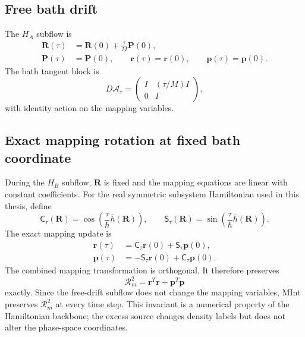 \documentclass[
  11pt,
  letterpaper,
  onehalfspacing,
  normalmargins,
  equalmargins,
  oneside
]{ut-thesis}
\begin{document}
\subsection{Free bath drift}
\label{subsec:ch5-free-drift}

The \(H_A\) subflow is
\begin{align}
\mathbf R(\tau)
&=
\mathbf R(0)+\frac{\tau}{M}\mathbf P(0),
\label{eq:ch5-A-R}
\\
\mathbf P(\tau)
&=
\mathbf P(0),
\qquad
\mathbf r(\tau)=\mathbf r(0),
\qquad
\mathbf p(\tau)=\mathbf p(0).
\label{eq:ch5-A-rest}
\end{align}
The bath tangent block is
\begin{equation}
D\mathcal A_\tau
=
\begin{pmatrix}
I & (\tau/M)I\\
0 & I
\end{pmatrix},
\label{eq:ch5-A-tangent}
\end{equation}
with identity action on the mapping variables.


\subsection{Exact mapping rotation at fixed bath coordinate}
\label{subsec:ch5-mapping-rotation}

During the \(H_B\) subflow, \(\mathbf R\) is fixed and the mapping equations
are linear with constant coefficients. For the real symmetric subsystem
Hamiltonian used in this thesis, define
\begin{equation}
\mathsf C_\tau(\mathbf R)
=
\cos\left(\frac{\tau}{\hbar}\bar h(\mathbf R)\right),
\qquad
\mathsf S_\tau(\mathbf R)
=
\sin\left(\frac{\tau}{\hbar}\bar h(\mathbf R)\right).
\label{eq:ch5-matrix-trigonometric-functions}
\end{equation}
The exact mapping update is
\begin{align}
\mathbf r(\tau)
&=
\mathsf C_\tau\mathbf r(0)+\mathsf S_\tau\mathbf p(0),
\label{eq:ch5-B-r}
\\
\mathbf p(\tau)
&=
-\mathsf S_\tau\mathbf r(0)+\mathsf C_\tau\mathbf p(0).
\label{eq:ch5-B-p}
\end{align}
The combined mapping transformation is orthogonal. It therefore preserves
\begin{equation}
\mathcal R_m^2
=
\mathbf r^T\mathbf r+
\mathbf p^T\mathbf p
\label{eq:ch5-mapping-radius}
\end{equation}
exactly. Since the free-drift subflow does not change the mapping variables,
MInt preserves \(\mathcal R_m^2\) at every time step. This invariant is a
numerical property of the Hamiltonian backbone; the excess source changes
density labels but does not alter the phase-space coordinates.
\end{document}
